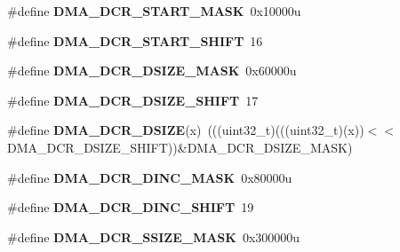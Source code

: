 \begin{DoxyCompactItemize}
\item 
\mbox{\label{group___d_m_a___register___masks_gaaaca42eb6474221a4e91f687194fafd6}} 
\#define {\bfseries D\+M\+A\+\_\+\+D\+C\+R\+\_\+\+S\+T\+A\+R\+T\+\_\+\+M\+A\+SK}~0x10000u
\item 
\mbox{\label{group___d_m_a___register___masks_ga86b820fe50e65e5c67d14ba4d3d36c6c}} 
\#define {\bfseries D\+M\+A\+\_\+\+D\+C\+R\+\_\+\+S\+T\+A\+R\+T\+\_\+\+S\+H\+I\+FT}~16
\item 
\mbox{\label{group___d_m_a___register___masks_ga2b7bfbe2aea8f1b41a42795ff78c4fd5}} 
\#define {\bfseries D\+M\+A\+\_\+\+D\+C\+R\+\_\+\+D\+S\+I\+Z\+E\+\_\+\+M\+A\+SK}~0x60000u
\item 
\mbox{\label{group___d_m_a___register___masks_ga6b04b13ff50c5d9247f9a12dd582d511}} 
\#define {\bfseries D\+M\+A\+\_\+\+D\+C\+R\+\_\+\+D\+S\+I\+Z\+E\+\_\+\+S\+H\+I\+FT}~17
\item 
\mbox{\label{group___d_m_a___register___masks_gaf044df6bf3889f7166fafff5ceab4f67}} 
\#define {\bfseries D\+M\+A\+\_\+\+D\+C\+R\+\_\+\+D\+S\+I\+ZE}(x)~(((uint32\+\_\+t)(((uint32\+\_\+t)(x))$<$$<$D\+M\+A\+\_\+\+D\+C\+R\+\_\+\+D\+S\+I\+Z\+E\+\_\+\+S\+H\+I\+FT))\&D\+M\+A\+\_\+\+D\+C\+R\+\_\+\+D\+S\+I\+Z\+E\+\_\+\+M\+A\+SK)
\item 
\mbox{\label{group___d_m_a___register___masks_gad93bc8cb86ddeb7a40d9cd80011f8ee7}} 
\#define {\bfseries D\+M\+A\+\_\+\+D\+C\+R\+\_\+\+D\+I\+N\+C\+\_\+\+M\+A\+SK}~0x80000u
\item 
\mbox{\label{group___d_m_a___register___masks_ga9a4a7d49cd76a2821e2cf192d3a49fcd}} 
\#define {\bfseries D\+M\+A\+\_\+\+D\+C\+R\+\_\+\+D\+I\+N\+C\+\_\+\+S\+H\+I\+FT}~19
\item 
\mbox{\label{group___d_m_a___register___masks_ga5be9c16cc5eddfdd04e7820f698cd401}} 
\#define {\bfseries D\+M\+A\+\_\+\+D\+C\+R\+\_\+\+S\+S\+I\+Z\+E\+\_\+\+M\+A\+SK}~0x300000u
\item 
\mbox{\label{group___d_m_a___register___masks_ga4229a9ea2db9960308edf51034836083}} 
$$
\end{DoxyCompactItemize}
